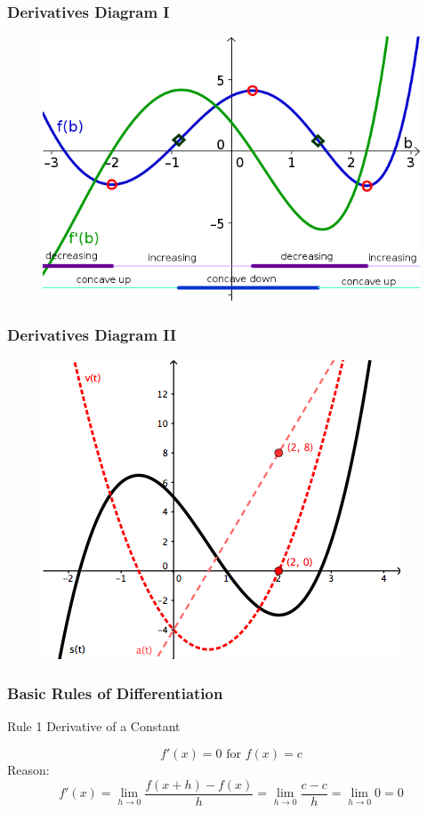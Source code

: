 \documentclass[xcolor=dvipsnames]{beamer}
\begin{document}
\begin{frame}
  \frametitle{Derivatives Diagram I}
  \begin{figure}[h]
    \includegraphics[scale=1.8]{./diagrams/derivs2.png}
  \end{figure}
\end{frame}

\begin{frame}
  \frametitle{Derivatives Diagram II}
  \begin{figure}[h]
    \includegraphics[scale=.6]{./diagrams/derivs1.png}
  \end{figure}
\end{frame}

\begin{frame}
  \frametitle{Basic Rules of Differentiation}
  \begin{block}{Rule 1}
Derivative of a Constant
  \end{block}
\begin{equation}
  \label{eq:ligoovah}
f'(x)=0\mbox{ for }f(x)=c
\end{equation}
Reason:
\begin{equation}
  \label{eq:ahnieluz}
f'(x)=\lim_{h\rightarrow{}0}\frac{f(x+h)-f(x)}{h}=\lim_{h\rightarrow{}0}\frac{c-c}{h}=\lim_{h\rightarrow{}0}0=0
\end{equation}
\end{frame}
\end{document}
